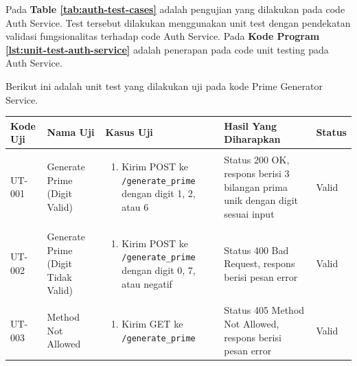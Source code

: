 Pada \textbf{Table \ref{tab:auth-test-cases}} adalah pengujian yang dilakukan
pada code Auth Service. Test tersebut dilakukan menggunakan unit test dengan
pendekatan validasi fungsionalitas terhadap code Auth Service. Pada
\textbf{Kode Program \ref{lst:unit-test-auth-service}} adalah penerapan pada
code unit testing pada Auth Service.

Berikut ini adalah unit test yang dilakukan uji pada kode Prime Generator
Service.
\begin{table}[H]
  \centering
  \small
  \begin{adjustbox}{width=\textwidth}
    \begin{tabular}{|p{0.8cm}|p{2.6cm}|p{4.5cm}|p{3.8cm}|p{1.2cm}|}
      \hline
      \textbf{Kode Uji}                                                             & \textbf{Nama Uji}                  & \textbf{Kasus Uji} & \textbf{Hasil Yang Diharapkan} & \textbf{Status} \\
      \hline
      UT-001                                                                        & Generate Prime (Digit Valid)       &
      \begin{enumerate}[leftmargin=*,noitemsep,topsep=0pt,label=\arabic*.,widest=99]
        \item Kirim POST ke \texttt{/generate\_prime} dengan digit 1, 2, atau 6
      \end{enumerate}       &
      Status 200 OK, respons berisi 3 bilangan prima unik dengan digit sesuai input & Valid                                                                                                      \\ \hline

      UT-002                                                                        & Generate Prime (Digit Tidak Valid) &
      \begin{enumerate}[leftmargin=*,noitemsep,topsep=0pt,label=\arabic*.,widest=99]
        \item Kirim POST ke \texttt{/generate\_prime} dengan digit 0, 7, atau negatif
      \end{enumerate} &
      Status 400 Bad Request, respons berisi pesan error                            & Valid                                                                                                      \\ \hline

      UT-003                                                                        & Method Not Allowed                 &
      \begin{enumerate}[leftmargin=*,noitemsep,topsep=0pt,label=\arabic*.,widest=99]
        \item Kirim GET ke \texttt{/generate\_prime}
      \end{enumerate}              &
      Status 405 Method Not Allowed, respons berisi pesan error                     & Valid                                                                                                      \\ \hline


\end{tabular}
\end{adjustbox}
\end{table}

